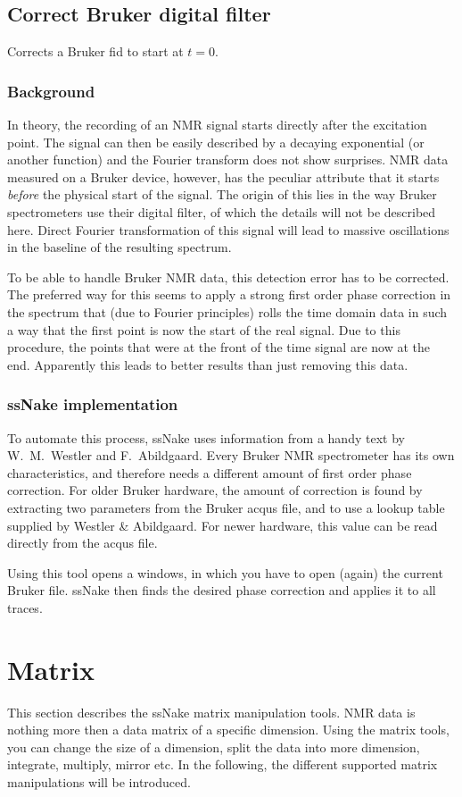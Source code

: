 \documentclass[11pt,a4paper]{article}
\begin{document}
\subsection{Correct Bruker digital filter}
Corrects a Bruker fid to start at $t=0$.

\subsubsection*{Background}
In theory, the recording of an NMR signal starts directly after the excitation point. The signal can then be easily described by a decaying exponential (or another function) and the Fourier transform does not show surprises. NMR data measured on a Bruker device, however, has the peculiar attribute that it starts \textit{before} the physical start of the signal. The origin of this lies in the way Bruker spectrometers use their digital filter, of which the details will not be described here. Direct Fourier transformation of this signal will lead to massive oscillations in the baseline of the resulting spectrum.

To be able to handle Bruker NMR data, this detection error has to be corrected. The preferred way for this seems to apply a strong first order phase correction in the spectrum that (due to Fourier principles) rolls the time domain data in such a way that the first point is now the start of the real signal. Due to this procedure, the points that were at the front of the time signal are now at the end. Apparently this leads to better results than just removing this data.

\subsubsection*{ssNake implementation}
To automate this process, ssNake uses information from a handy text by W.\ M.\ Westler and F.\ Abildgaard. Every Bruker NMR spectrometer has its own characteristics, and therefore needs a different amount of first order phase correction. For older Bruker hardware, the amount of correction is found by extracting two parameters from the Bruker acqus file, and to use a lookup table supplied by Westler \& Abildgaard. For newer hardware, this value can be read directly from the acqus file.

Using this tool opens a windows, in which you have to open (again) the current Bruker file. ssNake then finds the desired phase correction and applies it to all traces. 


\section{Matrix}
This section describes the ssNake matrix manipulation tools. NMR data is nothing more then a data matrix of a specific dimension. Using the matrix tools, you can change the size of a dimension, split the data into more dimension, integrate, multiply, mirror etc. In the following, the different supported matrix manipulations will be introduced.
\end{document}
